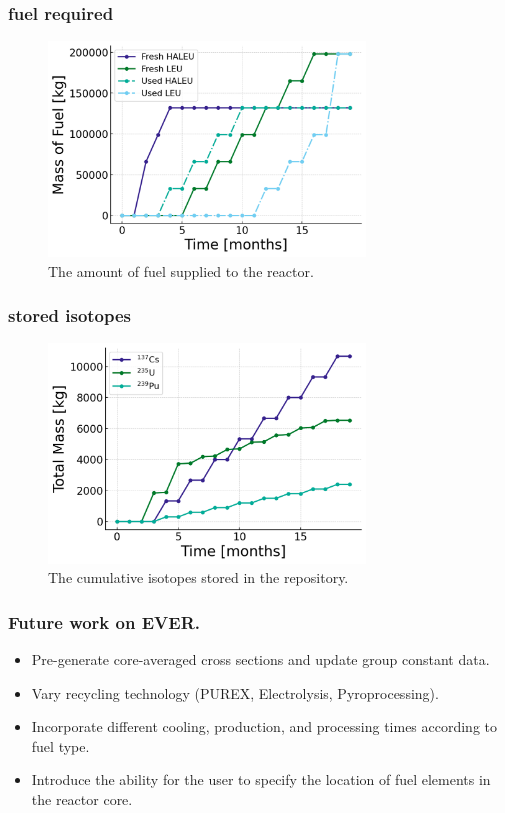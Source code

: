 \documentclass[9pt]{beamer}
\begin{document}
\begin{frame}
  \frametitle{fuel required}
  \begin{figure}
    \centering
    \includegraphics[width=0.75\textwidth]{images/mass_fuel.png}
    \caption{The amount of fuel supplied to the reactor.}
  \end{figure}
\end{frame}

\begin{frame}
  \frametitle{stored isotopes}
  \begin{figure}
    \centering
    \includegraphics[width=0.75\textwidth]{images/mass_isotopes.png}
    \caption{The cumulative isotopes stored in the repository.}
  \end{figure}
\end{frame}

\begin{frame}
  \frametitle{Future work on EVER.}
  \begin{itemize}
    \item Pre-generate core-averaged cross sections and update group constant data.
    \item Vary recycling technology (PUREX, Electrolysis, Pyroprocessing).
    \item Incorporate different cooling, production, and processing times according to fuel type.
    \item Introduce the ability for the user to specify the location of fuel elements in the reactor core.
  \end{itemize}
\end{frame}
\end{document}
